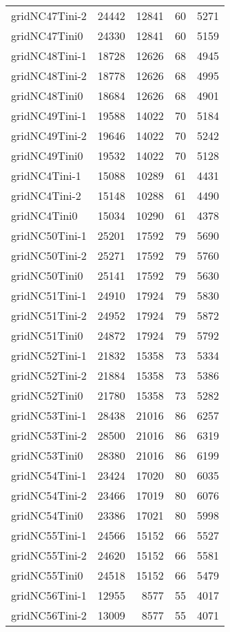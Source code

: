 \begin{tabular}{lrrrr}
gridNC47Tini-2 & 24442 & 12841 & 60 & 5271 \\
gridNC47Tini0 & 24330 & 12841 & 60 & 5159 \\
gridNC48Tini-1 & 18728 & 12626 & 68 & 4945 \\
gridNC48Tini-2 & 18778 & 12626 & 68 & 4995 \\
gridNC48Tini0 & 18684 & 12626 & 68 & 4901 \\
gridNC49Tini-1 & 19588 & 14022 & 70 & 5184 \\
gridNC49Tini-2 & 19646 & 14022 & 70 & 5242 \\
gridNC49Tini0 & 19532 & 14022 & 70 & 5128 \\
gridNC4Tini-1 & 15088 & 10289 & 61 & 4431 \\
gridNC4Tini-2 & 15148 & 10288 & 61 & 4490 \\
gridNC4Tini0 & 15034 & 10290 & 61 & 4378 \\
gridNC50Tini-1 & 25201 & 17592 & 79 & 5690 \\
gridNC50Tini-2 & 25271 & 17592 & 79 & 5760 \\
gridNC50Tini0 & 25141 & 17592 & 79 & 5630 \\
gridNC51Tini-1 & 24910 & 17924 & 79 & 5830 \\
gridNC51Tini-2 & 24952 & 17924 & 79 & 5872 \\
gridNC51Tini0 & 24872 & 17924 & 79 & 5792 \\
gridNC52Tini-1 & 21832 & 15358 & 73 & 5334 \\
gridNC52Tini-2 & 21884 & 15358 & 73 & 5386 \\
gridNC52Tini0 & 21780 & 15358 & 73 & 5282 \\
gridNC53Tini-1 & 28438 & 21016 & 86 & 6257 \\
gridNC53Tini-2 & 28500 & 21016 & 86 & 6319 \\
gridNC53Tini0 & 28380 & 21016 & 86 & 6199 \\
gridNC54Tini-1 & 23424 & 17020 & 80 & 6035 \\
gridNC54Tini-2 & 23466 & 17019 & 80 & 6076 \\
gridNC54Tini0 & 23386 & 17021 & 80 & 5998 \\
gridNC55Tini-1 & 24566 & 15152 & 66 & 5527 \\
gridNC55Tini-2 & 24620 & 15152 & 66 & 5581 \\
gridNC55Tini0 & 24518 & 15152 & 66 & 5479 \\
gridNC56Tini-1 & 12955 & 8577 & 55 & 4017 \\
gridNC56Tini-2 & 13009 & 8577 & 55 & 4071 \\

\end{tabular}
